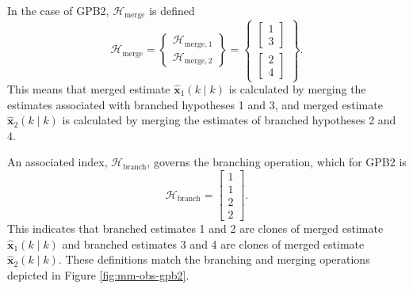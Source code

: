 {{In the case of \gls{GPB2}, $\mathcal{H}_{\text{merge}}$ is defined
\begin{equation} \label{eq:Hmerge_GPB2}
	\mathcal{H}_{\text{merge}} = \begin{Bmatrix} \mathcal{H}_{\text{merge},1} \\ \mathcal{H}_{\text{merge},2} \end{Bmatrix} = \begin{Bmatrix}
		\begin{bmatrix}	1 \\ 3 \end{bmatrix} \\
		\begin{bmatrix}	2 \\ 4 \end{bmatrix}
	\end{Bmatrix}.
\end{equation}
This means that merged estimate $\mathbf{\hat{x}}_1(k \mid k)$ is calculated by merging the estimates associated with branched hypotheses 1 and 3, and merged estimate $\mathbf{\hat{x}}_2(k \mid k)$ is calculated by merging the estimates of branched hypotheses 2 and 4.

An associated index, $\mathcal{H}_{\text{branch}}$, governs the branching operation, which for \gls{GPB2} is
%
\begin{equation} \label{eq:Hbranch_GPB2}
	\mathcal{H}_{\text{branch}} = \begin{bmatrix} 1 \\ 1 \\ 2 \\ 2 \end{bmatrix}.
\end{equation}
This indicates that branched estimates 1 and 2 are clones of merged estimate $\mathbf{\hat{x}}_1(k \mid k)$ and branched estimates 3 and 4 are clones of merged estimate $\mathbf{\hat{x}}_2(k \mid k)$. These definitions match the branching and merging operations depicted in Figure \ref{fig:mm-obs-gpb2}.

}}
